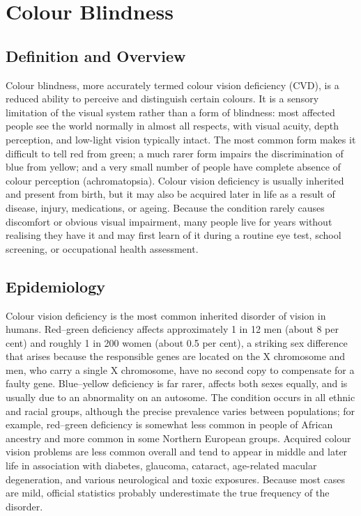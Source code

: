 \chapter{Colour Blindness}

\section*{Definition and Overview}
Colour blindness, more accurately termed colour vision deficiency (CVD), is a reduced ability to perceive and distinguish certain colours. It is a sensory limitation of the visual system rather than a form of blindness: most affected people see the world normally in almost all respects, with visual acuity, depth perception, and low-light vision typically intact. The most common form makes it difficult to tell red from green; a much rarer form impairs the discrimination of blue from yellow; and a very small number of people have complete absence of colour perception (achromatopsia). Colour vision deficiency is usually inherited and present from birth, but it may also be acquired later in life as a result of disease, injury, medications, or ageing. Because the condition rarely causes discomfort or obvious visual impairment, many people live for years without realising they have it and may first learn of it during a routine eye test, school screening, or occupational health assessment.

\section*{Epidemiology}
Colour vision deficiency is the most common inherited disorder of vision in humans. Red--green deficiency affects approximately 1 in 12 men (about 8 per cent) and roughly 1 in 200 women (about 0.5 per cent), a striking sex difference that arises because the responsible genes are located on the X chromosome and men, who carry a single X chromosome, have no second copy to compensate for a faulty gene. Blue--yellow deficiency is far rarer, affects both sexes equally, and is usually due to an abnormality on an autosome. The condition occurs in all ethnic and racial groups, although the precise prevalence varies between populations; for example, red--green deficiency is somewhat less common in people of African ancestry and more common in some Northern European groups. Acquired colour vision problems are less common overall and tend to appear in middle and later life in association with diabetes, glaucoma, cataract, age-related macular degeneration, and various neurological and toxic exposures. Because most cases are mild, official statistics probably underestimate the true frequency of the disorder.

